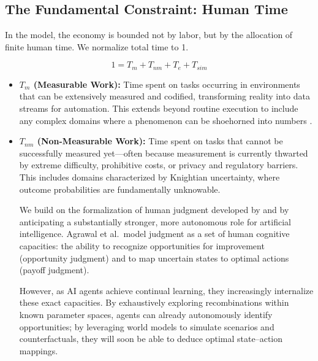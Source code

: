 \documentclass[12pt, letter]{article}
\begin{document}
\subsection{The Fundamental Constraint: Human Time}\label{sec:humantime}

In the model, the economy is bounded not by labor, but by the allocation of finite human time. We normalize total time to 1.

\begin{equation}
    1 = T_m + T_{nm} + T_e + T_{sim}
\end{equation}

\begin{itemize}
    \item \textbf{$T_m$ (Measurable Work):} Time spent on tasks occurring in environments that can be extensively measured and codified, transforming reality into data streams for automation. This extends beyond routine execution to include any complex domains where a phenomenon can be shoehorned into numbers \citep{Catalini2025}.
    
    \item \textbf{$T_{nm}$ (Non-Measurable Work):} Time spent on tasks that cannot be successfully measured yet---often because measurement is currently thwarted by extreme difficulty, prohibitive costs, or privacy and regulatory barriers. This includes domains characterized by Knightian uncertainty, where outcome probabilities are fundamentally unknowable. 

    We build on the formalization of human judgment developed by \citet{Agrawal2018_NBER} and \citet{AgrawalGansGoldfarbBicycles} by anticipating a substantially stronger, more autonomous role for artificial intelligence. Agrawal et al.\ model judgment as a set of human cognitive capacities: the ability to recognize opportunities for improvement (opportunity judgment) and to map uncertain states to optimal actions (payoff judgment). 

    However, as AI agents achieve continual learning, they increasingly internalize these exact capacities. By exhaustively exploring recombinations within known parameter spaces, agents can already autonomously identify opportunities; by leveraging world models to simulate scenarios and counterfactuals, they will soon be able to deduce optimal state--action mappings. 


\end{itemize}
\end{document}
